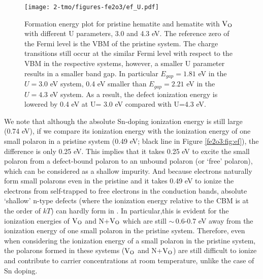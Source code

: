 

\begin{figure}[t!]
\begin{center}
\texttt{[image: 2-tmo/figures-fe2o3/ef\_U.pdf]} %
\end{center}
\caption{Formation energy plot for pristine hematite and hematite with $\text{V}_\text{O}$ with different U parameters, 3.0 and 4.3 eV. The reference zero of the Fermi level is the VBM of the pristine system.
The charge transitions still occur at the similar Fermi level with respect to the VBM in the respective systems, however, a smaller U parameter results in a smaller band gap. In particular $E_{gap}=1.81$ eV in the $U=3.0$ eV system, 0.4 eV smaller than $E_{gap}=2.21$ eV in the $U=4.3$ eV system.
As a result, the defect ionization energy is lowered by 0.4 eV at U= 3.0 eV compared with U=4.3 eV.} \label{fe2o3:fig:efu}
\end{figure}


We note that although the absolute Sn-doping ionization energy is still large (0.74 eV), if we compare its ionization energy with the ionization energy of one small polaron in a pristine system (0.49 eV; black line in Figure \ref{fe2o3:fig:ef}), the difference is only 0.25 eV. This implies that it takes 0.25 eV to excite the small polaron from a defect-bound polaron to an unbound polaron (or `free' polaron), which can be considered as a shallow impurity. And because electrons naturally form small polarons even in the pristine  and it takes 0.49 eV to ionize the electrons from self-trapped to free electrons in the conduction bands, absolute `shallow' n-type defects (where the ionization energy relative to the CBM is at the order of $kT$) can hardly form in . In particular,this is evident for the ionization energies of $\text{V}_\text{O}$ and N+$\text{V}_\text{O}$ which are still $\sim\,$0.6-0.7 eV away from the ionization energy of one small polaron in the pristine system. Therefore, even when considering the ionization energy of a small polaron in the pristine system, the polarons formed in these systems ($\text{V}_\text{O}$ and N+$\text{V}_\text{O}$) are still difficult to ionize and contribute to carrier concentrations at room temperature, unlike the case of Sn doping. \\


